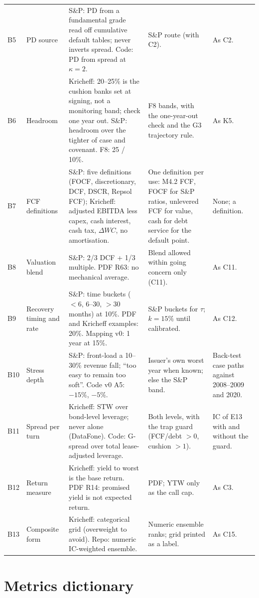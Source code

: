 \documentclass[11pt]{article}
\begin{document}
{\begin{xltabular}{\linewidth}{@{}>{\raggedright\arraybackslash}p{9mm}>{\raggedright\arraybackslash}p{24mm}>{\raggedright\arraybackslash}X>{\raggedright\arraybackslash}p{38mm}>{\raggedright\arraybackslash}p{30mm}@{}}
B5 & PD source & S\&P: PD from a fundamental grade read off cumulative default tables; never inverts spread. Code: PD from spread at $\kappa=2$. & S\&P route (with C2). & As C2. \\
B6 & Headroom & Kricheff: 20--25\% is the cushion banks set at signing, not a monitoring band; check one year out. S\&P: headroom over the tighter of case and covenant. F8: 25 / 10\%. & F8 bands, with the one-year-out check and the G3 trajectory rule. & As K5. \\
B7 & FCF definitions & S\&P: five definitions (FOCF, discretionary, DCF, DSCR, Repsol FCF); Kricheff: adjusted EBITDA less capex, cash interest, cash tax, $\Delta WC$, no amortisation. & One definition per use: M4.2 FCF, FOCF for S\&P ratios, unlevered FCF for value, cash for debt service for the default point. & None; a definition. \\
B8 & Valuation blend & S\&P: 2/3 DCF + 1/3 multiple. PDF R63: no mechanical average. & Blend allowed within going concern only (C11). & As C11. \\
B9 & Recovery timing and rate & S\&P: time buckets ($<6$, 6--30, $>30$ months) at 10\%. PDF and Kricheff examples: 20\%. Mapping v0: 1 year at 15\%. & S\&P buckets for $\tau$; $k = 15\%$ until calibrated. & As C12. \\
B10 & Stress depth & S\&P: front-load a 10--30\% revenue fall; ``too easy to remain too soft''. Code v0 A5: $-15\%$, $-5\%$. & Issuer's own worst year when known; else the S\&P band. & Back-test case paths against 2008--2009 and 2020. \\
B11 & Spread per turn & Kricheff: STW over bond-level leverage; never alone (DataFone). Code: G-spread over total lease-adjusted leverage. & Both levels, with the trap guard (FCF/debt $>0$, cushion $>1$). & IC of E13 with and without the guard. \\
B12 & Return measure & Kricheff: yield to worst is the base return. PDF R14: promised yield is not expected return. & PDF; YTW only as the call cap. & As C3. \\
B13 & Composite form & Kricheff: categorical grid (overweight to avoid). Repo: numeric IC-weighted ensemble. & Numeric ensemble ranks; grid printed as a label. & As C15. \\
\bottomrule
\end{xltabular}
}
\newpage
\section{Metrics dictionary}\label{sec:dict}
\end{document}
